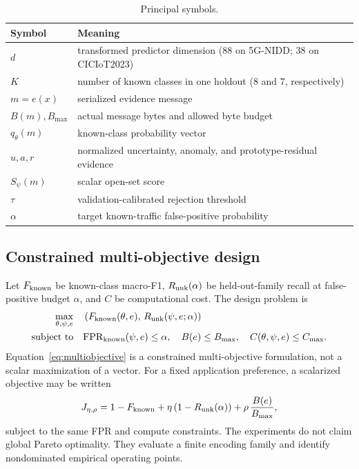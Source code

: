 \begin{table}[H]
\caption{Principal symbols.}
\label{tab:notation}
\centering
\begin{tabular}{ll}
\toprule
Symbol & Meaning \\
\midrule
$d$ & transformed predictor dimension ($88$ on 5G-NIDD; $38$ on CICIoT2023) \\
$K$ & number of known classes in one holdout ($8$ and $7$, respectively) \\
$m=e(x)$ & serialized evidence message \\
$B(m), B_{\max}$ & actual message bytes and allowed byte budget \\
$q_\theta(m)$ & known-class probability vector \\
$u,a,r$ & normalized uncertainty, anomaly, and prototype-residual evidence \\
$S_\psi(m)$ & scalar open-set score \\
$\tau$ & validation-calibrated rejection threshold \\
$\alpha$ & target known-traffic false-positive probability \\
\bottomrule
\end{tabular}
\end{table}

\subsection{Constrained multi-objective design}

Let $F_{\rm known}$ be known-class macro-F1, $R_{\rm unk}(\alpha)$ be held-out-family recall at false-positive budget $\alpha$, and $C$ be computational cost. The design problem is
\begin{equation}
\begin{aligned}
\max_{\theta,\psi,e}\quad&
\left(F_{\rm known}(\theta,e),\,R_{\rm unk}(\psi,e;\alpha)\right)\\
\text{subject to}\quad&
\mathrm{FPR}_{\rm known}(\psi,e)\leq\alpha,\quad
B(e)\leq B_{\max},\quad C(\theta,\psi,e)\leq C_{\max}.
\end{aligned}
\label{eq:multiobjective}
\end{equation}
Equation~\eqref{eq:multiobjective} is a constrained multi-objective formulation, not a scalar maximization of a vector. For a fixed application preference, a scalarized objective may be written
\begin{equation}
J_{\eta,\rho}=1-F_{\rm known}+\eta\left(1-R_{\rm unk}(\alpha)\right)
+\rho\,\frac{B(e)}{B_{\max}},
\label{eq:scalarization}
\end{equation}
subject to the same FPR and compute constraints. The experiments do not claim global Pareto optimality. They evaluate a finite encoding family and identify nondominated empirical operating points.
